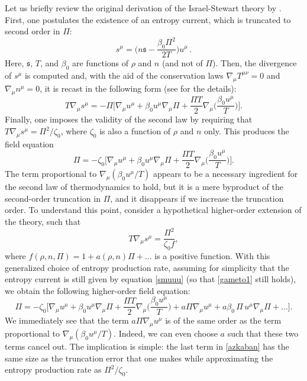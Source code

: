 \documentclass[aps,prl,noshowpacs,noshowkeys,floatfix,superscriptaddress,singlecolum,nofootinbib]{revtex4-2}
\theoremstyle{definition}
\theoremstyle{theorem}
\begin{document}
Let us briefly review the original derivation of the Israel-Stewart theory by \citet{Hishcock1983}. First, one postulates the existence of an entropy current, which is truncated to second order in $\Pi$:
\begin{equation}\label{smuuu}
    s^\mu = \bigg( n\mathfrak{s} - \dfrac{\beta_0 \Pi^2}{2T} \bigg)u^\mu \, .
\end{equation}
Here, $\mathfrak{s}$, $T$, and $\beta_0$ are functions of $\rho$ and $n$ (and not of $\Pi$). Then, the divergence of $s^\mu$ is computed and, with the aid of the conservation laws $\nabla_\mu T^{\mu \nu}=0$ and $\nabla_\mu n^\mu=0$, it is recast in the following form (see \cite{Hishcock1983} for the details):
\begin{equation}\label{gameto1}
    T\nabla_\mu s^\mu = -\Pi \bigg[\nabla_\mu u^\mu +\beta_0 u^\mu \nabla_\mu \Pi +\dfrac{\Pi T}{2} \nabla_\mu\bigg(\dfrac{\beta_0 u^\mu }{T}\bigg) \bigg].
\end{equation}
Finally, one imposes the validity of the second law by requiring that $T\nabla_\mu s^\mu =\Pi^2/\zeta_0$, where $\zeta_0$ is also a function of $\rho$ and $n$ only. This produces the field equation
\begin{equation}\label{azkaban}
    \Pi = -\zeta_0 \bigg[\nabla_\mu u^\mu +\beta_0 u^\mu \nabla_\mu \Pi +\dfrac{\Pi T}{2} \nabla_\mu\bigg(\dfrac{\beta_0 u^\mu }{T}\bigg) \bigg] .
\end{equation}
The term proportional to $\nabla_\mu (\beta_0 u^\mu/T)$ appears to be a necessary ingredient for the second law of thermodynamics to hold, but it is a mere byproduct of the second-order truncation in $\Pi$, and it disappears if we increase the truncation order. To understand this point, consider a hypothetical higher-order extension of the theory, such that
\begin{equation}\label{gameto2}
    T \nabla_\mu s^\mu = \dfrac{\Pi^2}{ \zeta_0 f},
\end{equation}
where $f(\rho,n,\Pi)=1+a(\rho,n)\Pi+...$ is a positive function. With this generalized choice of entropy production rate, assuming for simplicity that the entropy current is still given by equation \eqref{smuuu} (so that \eqref{gameto1} still holds), we obtain the following higher-order field equation:
\begin{equation}
    \Pi = -\zeta_0 \bigg[\nabla_\mu u^\mu +\beta_0 u^\mu \nabla_\mu \Pi +\dfrac{\Pi T}{2} \nabla_\mu\bigg(\dfrac{\beta_0 u^\mu }{T}\bigg)+a\Pi \nabla_\mu u^\mu+ a\beta_0 \, \Pi \, u^\mu \nabla_\mu \Pi +...\bigg] .
\end{equation}
We immediately see that the term $a\Pi \nabla_\mu u^\mu$ is of the same order as the term proportional to $\nabla_\mu (\beta_0 u^\mu/T)$. Indeed, we can even choose $a$ such that these two terms cancel out. The implication is simple: the last term in \eqref{azkaban} has the same size as the truncation error that one makes while approximating the entropy production rate as $\Pi^2/\zeta_0$. 
\end{document}
